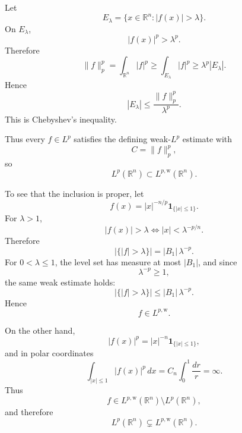 \begin{solution}
Let
\[
E_\lambda
=
\{x\in\mathbb R^n:|f(x)|>\lambda\}.
\]
On \(E_\lambda\),
\[
|f(x)|^p>\lambda^p.
\]
Therefore
\[
\|f\|_p^p
=
\int_{\mathbb R^n}|f|^p
\ge
\int_{E_\lambda}|f|^p
\ge
\lambda^p|E_\lambda|.
\]
Hence
\[
\boxed{
|E_\lambda|
\le
\frac{\|f\|_p^p}{\lambda^p}.
}
\]
This is Chebyshev's inequality.

Thus every \(f\in L^p\) satisfies the defining weak-\(L^p\) estimate with
\[
C=\|f\|_p^p,
\]
so
\[
\boxed{
L^p(\mathbb R^n)
\subset
L^{p,\mathrm w}(\mathbb R^n).
}
\]

To see that the inclusion is proper, let
\[
f(x)
=
|x|^{-n/p}\mathbf1_{\{|x|\le1\}}.
\]
For \(\lambda>1\),
\[
|f(x)|>\lambda
\iff
|x|<\lambda^{-p/n}.
\]
Therefore
\[
|\{|f|>\lambda\}|
=
|B_1|\,\lambda^{-p}.
\]
For \(0<\lambda\le1\), the level set has measure at most \(|B_1|\), and since
\[
\lambda^{-p}\ge1,
\]
the same weak estimate holds:
\[
|\{|f|>\lambda\}|
\le
|B_1|\,\lambda^{-p}.
\]
Hence
\[
f\in L^{p,\mathrm w}.
\]

On the other hand,
\[
|f(x)|^p
=
|x|^{-n}\mathbf1_{\{|x|\le1\}},
\]
and in polar coordinates
\[
\int_{|x|\le1}|f(x)|^p\,dx
=
C_n
\int_0^1\frac{dr}{r}
=
\infty.
\]
Thus
\[
\boxed{
f\in
L^{p,\mathrm w}(\mathbb R^n)
\setminus
L^p(\mathbb R^n),
}
\]
and therefore
\[
\boxed{
L^p(\mathbb R^n)
\subsetneq
L^{p,\mathrm w}(\mathbb R^n).
}
\]
\end{solution}


